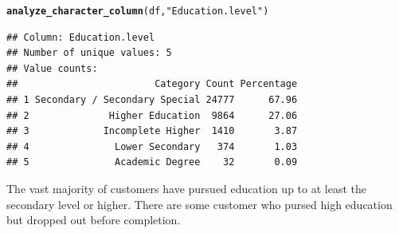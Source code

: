 \documentclass{article}\usepackage[]{graphicx}\usepackage[]{xcolor}
\makeatletter
\newcommand{\hlsng}[1]{\textcolor[rgb]{0.192,0.494,0.8}{#1}}%
\newcommand{\hldef}[1]{\textcolor[rgb]{0.345,0.345,0.345}{#1}}%
\newcommand{\hlkwd}[1]{\textcolor[rgb]{0.737,0.353,0.396}{\textbf{#1}}}%
\newenvironment{kframe}{%
 \def\at@end@of@kframe{}%
 \ifinner\ifhmode%
  \def\at@end@of@kframe{\end{minipage}}%
  \begin{minipage}{\columnwidth}%
 \fi\fi%
 \def\FrameCommand##1{\hskip\@totalleftmargin \hskip-\fboxsep
 \colorbox{shadecolor}{##1}\hskip-\fboxsep
     \hskip-\linewidth \hskip-\@totalleftmargin \hskip\columnwidth}%
 \MakeFramed {\advance\hsize-\width
   \@totalleftmargin\z@ \linewidth\hsize
   \@setminipage}}%
 {\par\unskip\endMakeFramed%
 \at@end@of@kframe}
\newenvironment{knitrout}{}{} %
\makeatother
\begin{document}
\begin{knitrout}
\color{fgcolor}\begin{kframe}
\begin{alltt}
\hlkwd{analyze_character_column}\hldef{(df,} \hlsng{"Education.level"}\hldef{)}
\end{alltt}
\begin{verbatim}
## Column: Education.level 
## Number of unique values: 5 
## Value counts:
##                        Category Count Percentage
## 1 Secondary / Secondary Special 24777      67.96
## 2              Higher Education  9864      27.06
## 3             Incomplete Higher  1410       3.87
## 4               Lower Secondary   374       1.03
## 5               Academic Degree    32       0.09
\end{verbatim}
\end{kframe}
\end{knitrout}

The vast majority of customers have pursued education up to at least the secondary level or higher. There are some customer who pursed high education but dropped out before completion.
\end{document}
